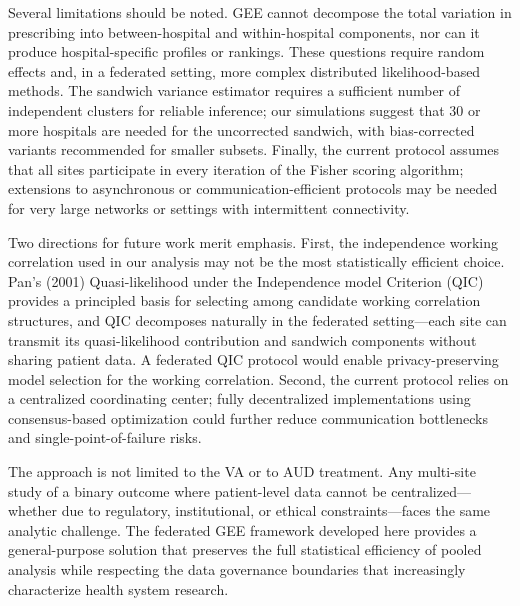 \documentclass[useAMS,referee]{biom}
\begin{document}
Several limitations should be noted. GEE cannot decompose the total variation in prescribing into between-hospital and within-hospital components, nor can it produce hospital-specific profiles or rankings. These questions require random effects and, in a federated setting, more complex distributed likelihood-based methods. The sandwich variance estimator requires a sufficient number of independent clusters for reliable inference; our simulations suggest that 30 or more hospitals are needed for the uncorrected sandwich, with bias-corrected variants recommended for smaller subsets. Finally, the current protocol assumes that all sites participate in every iteration of the Fisher scoring algorithm; extensions to asynchronous or communication-efficient protocols may be needed for very large networks or settings with intermittent connectivity.

Two directions for future work merit emphasis. First, the independence working correlation used in our analysis may not be the most statistically efficient choice. Pan's (2001) Quasi-likelihood under the Independence model Criterion (QIC) provides a principled basis for selecting among candidate working correlation structures, and QIC decomposes naturally in the federated setting---each site can transmit its quasi-likelihood contribution and sandwich components without sharing patient data. A federated QIC protocol would enable privacy-preserving model selection for the working correlation. Second, the current protocol relies on a centralized coordinating center; fully decentralized implementations using consensus-based optimization could further reduce communication bottlenecks and single-point-of-failure risks.

The approach is not limited to the VA or to AUD treatment. Any multi-site study of a binary outcome where patient-level data cannot be centralized---whether due to regulatory, institutional, or ethical constraints---faces the same analytic challenge. The federated GEE framework developed here provides a general-purpose solution that preserves the full statistical efficiency of pooled analysis while respecting the data governance boundaries that increasingly characterize health system research.


\newpage

\backmatter



\end{document}
